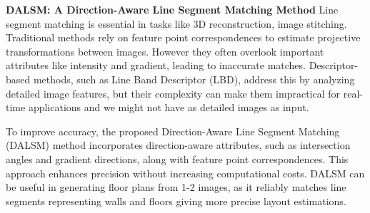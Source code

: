 \textbf{DALSM: A Direction-Aware Line Segment Matching Method}
Line segment matching is essential in tasks like 3D reconstruction, image stitching. Traditional methods rely on feature point correspondences to estimate projective transformations between images. 
However they often overlook important attributes like intensity and gradient, leading to inaccurate matches. 
Descriptor-based methods, such as Line Band Descriptor (LBD), address this by analyzing detailed image features, but their complexity can make them impractical for real-time applications and we might not have as detailed images as input.

To improve accuracy, the proposed Direction-Aware Line Segment Matching (DALSM) method incorporates direction-aware attributes, such as intersection angles and gradient directions, along with feature point correspondences. 
This approach enhances precision without increasing computational costs. 
DALSM can be useful in generating floor plans from 1-2 images, as it reliably matches line segments representing walls and floors giving more precise layout estimations.